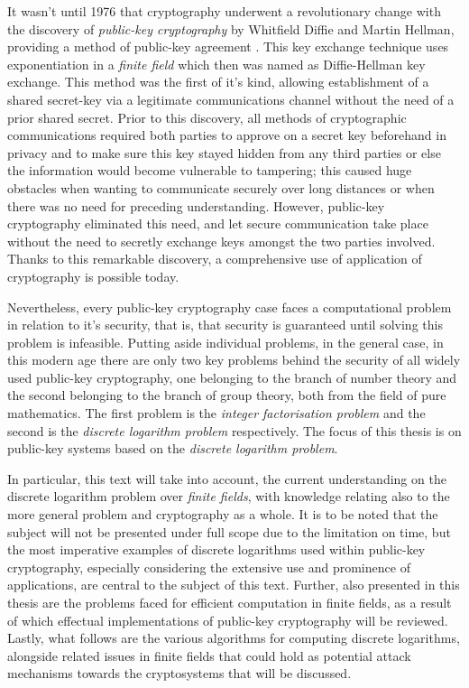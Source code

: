 \documentclass[iwp,first]{luthesis}
\begin{document}
It wasn't until 1976 that cryptography underwent a revolutionary change with the discovery of \textit{public-key cryptography} by Whitfield Diffie and Martin Hellman, providing a method of public-key agreement \cite{NDCrypt}. This key exchange technique uses exponentiation in a \textit{finite field} which then was named as Diffie-Hellman key exchange. This method was the first of it's kind, allowing establishment of a shared secret-key via a legitimate communications channel without the need of a prior shared secret. Prior to this discovery, all methods of cryptographic communications required both parties to approve on a secret key beforehand in privacy and to make sure this key stayed hidden from any third parties or else the information would become vulnerable to tampering; this caused huge obstacles when wanting to communicate securely over long distances or when there was no need for preceding understanding. However, public-key cryptography eliminated this need, and let secure communication take place without the need to secretly exchange keys amongst the two parties involved. Thanks to this remarkable discovery, a  comprehensive use of application of cryptography is possible today.

Nevertheless, every public-key cryptography case faces a computational problem in relation to it's security, that is, that security is guaranteed until solving this problem is infeasible. Putting aside individual problems, in the general case, in this modern age there are only two key problems behind the security of all widely used public-key cryptography, one belonging to the branch of number theory and the second belonging to the branch of group theory, both from the field of pure mathematics. The first problem is the \textit{integer factorisation problem} and the second is the \textit{discrete logarithm problem} respectively. The focus of this thesis is on public-key systems based on the \textit{discrete logarithm problem}.

In particular, this text will take into account, the current understanding on the discrete logarithm problem over \textit{finite fields}, with knowledge relating also to the more general problem and cryptography as a whole. It is to be noted that the subject will not be presented under full scope due to the limitation on time, but the most imperative examples of discrete logarithms used within public-key cryptography, especially considering the extensive use and prominence of applications, are central to the subject of this text. Further, also presented in this thesis are the problems faced for efficient computation in finite fields, as a result of which effectual implementations of public-key cryptography will be reviewed. Lastly, what follows are the various algorithms for computing discrete logarithms, alongside related issues in finite fields that could hold as potential attack mechanisms towards the cryptosystems that will be discussed.
\end{document}
